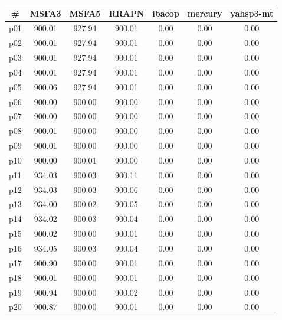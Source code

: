 \begin{tabular}{c||c|c|c|c|c|c}
\textbf{\#} & \textbf{MSFA3} & \textbf{MSFA5} & \textbf{RRAPN} & \textbf{ibacop} & \textbf{mercury} & \textbf{yahsp3-mt}\\
\hline
\hline
p01 & 900.01 & 927.94 & 900.01 & 0.00 & 0.00 & 0.00\\
p02 & 900.01 & 927.94 & 900.01 & 0.00 & 0.00 & 0.00\\
p03 & 900.01 & 927.94 & 900.01 & 0.00 & 0.00 & 0.00\\
p04 & 900.01 & 927.94 & 900.01 & 0.00 & 0.00 & 0.00\\
p05 & 900.06 & 927.94 & 900.01 & 0.00 & 0.00 & 0.00\\
p06 & 900.00 & 900.00 & 900.00 & 0.00 & 0.00 & 0.00\\
p07 & 900.00 & 900.00 & 900.00 & 0.00 & 0.00 & 0.00\\
p08 & 900.01 & 900.00 & 900.00 & 0.00 & 0.00 & 0.00\\
p09 & 900.01 & 900.00 & 900.00 & 0.00 & 0.00 & 0.00\\
p10 & 900.00 & 900.01 & 900.00 & 0.00 & 0.00 & 0.00\\
p11 & 934.03 & 900.03 & 900.11 & 0.00 & 0.00 & 0.00\\
p12 & 934.03 & 900.03 & 900.06 & 0.00 & 0.00 & 0.00\\
p13 & 934.00 & 900.02 & 900.05 & 0.00 & 0.00 & 0.00\\
p14 & 934.02 & 900.03 & 900.04 & 0.00 & 0.00 & 0.00\\
p15 & 900.02 & 900.00 & 900.01 & 0.00 & 0.00 & 0.00\\
p16 & 934.05 & 900.03 & 900.04 & 0.00 & 0.00 & 0.00\\
p17 & 900.90 & 900.00 & 900.01 & 0.00 & 0.00 & 0.00\\
p18 & 900.01 & 900.00 & 900.01 & 0.00 & 0.00 & 0.00\\
p19 & 900.94 & 900.00 & 900.02 & 0.00 & 0.00 & 0.00\\
p20 & 900.87 & 900.00 & 900.01 & 0.00 & 0.00 & 0.00\\
\end{tabular}

